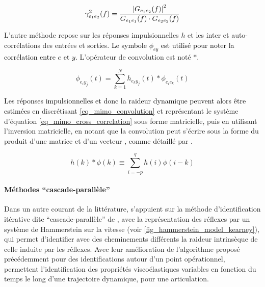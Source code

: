 \begin{equation} \label{eq_mimo_coherence}
	\gamma^2_{e_1e_2}(f) = \dfrac{\left\lvert G_{e_1e_2}(f)\right\rvert^2}{G_{e_1e_1}(f)\cdot G_{e_2e_2}(f)}
\end{equation}

L'autre méthode repose sur les réponses impulsionnelles $h$ et les inter et auto-corrélations des entrées et sorties. \textcolor{black}{Le symbole $\phi_{ey}$ est utilisé pour noter la corrélation entre $e$ et $y$.} %
L'opérateur de convolution est noté $*$.

\begin{equation}\label{eq_mimo_cross_correlation}
\phi_{e_iy_j}(t) = \sum_{k=1}^{N}h_{e_ky_j}(t) * \phi_{e_ie_k}(t)
\end{equation}

\textcolor{black}{Les réponses impulsionnelles et donc la raideur dynamique peuvent alors être estimées} en discrétisant \cref{eq_mimo_convolution} et représentant le système d'équation \cref{eq_mimo_cross_correlation} sous forme matricielle, puis en utilisant l'inversion matricielle, en notant que la convolution peut s'écrire sous la forme du produit d'une matrice et d'un vecteur%
, comme détaillé par \textcite{hunter_two-sided_1983}.

\begin{equation}\label{eq_mimo_convolution}
	h(k)*\phi(k) \equiv \sum_{i=-p}^{q}h(i)\phi(i-k)
\end{equation}


\paragraph{Méthodes \foreignquote{french}{cascade-parallèle}}
	
Dans un autre courant de la littérature, \textcite{ludvig_identification_2011} s'appuient sur la méthode d'identification itérative dite \foreignquote{french}{cascade-parallèle} de \textcite{kearney_identification_1997}, avec la représentation des réflexes par un système de Hammerstein sur la vitesse (voir \cref{fig_hammerstein_model_kearney}), qui permet d'identifier avec des cheminements différents la raideur intrinsèque de celle induite par les réflexes. Avec leur amélioration de l'algorithme proposé précédemment pour des identifications autour d'un point opérationnel, \textcite{ludvig_identification_2011} permettent l'identification des propriétés viscoélastiques variables en fonction du temps le long d'une trajectoire dynamique, pour une articulation.

